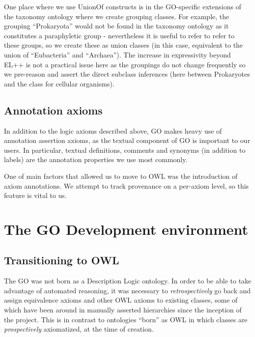 \documentclass{llncs}
\begin{document}
One place where we use UnionOf constructs is in the GO-specific
extensions of the taxonomy ontology where we create grouping
classes. For example, the grouping ``Prokaryota'' would not be found
in the taxonomy ontology as it constitutes a paraphyletic group -
nevertheless it is useful to refer to refer to these groups, so we
create these as union classes (in this case, equivalent to the union
of ``Eubacteria'' and ``Archaea''). The increase in expressivity
beyond EL++ is not a practical issue here as the groupings do not
change frequently so we pre-reason and assert the direct subclass
inferences (here between Prokaryotes and the class for cellular
organisms).


\subsection{Annotation axioms}

In addition to the logic axioms described above, GO makes heavy use of
annotation assertion axioms, as the textual component of GO is
important to our users. In particular, textual definitions, comments
and synonyms (in addition to labels) are the annotation properties we
use most commonly.

One of main factors that allowed us to move to OWL was the
introduction of axiom annotations. We attempt to track provenance on a
per-axiom level, so this feature is vital to us.


\section{The GO Development environment}

\subsection{Transitioning to OWL}

The GO was not born as a Description Logic ontology. In order to be
able to take advantage of automated reasoning, it was necessary to
\emph{retrospectively} go back and assign equivalence axioms and other
OWL axioms to existing classes, some of which have been around in
manually asserted hierarchies since the inception of the project. This
is in contrast to ontologies ``born'' as OWL in which classes are
\emph{prospectively} axiomatized, at the time of creation.
\end{document}
